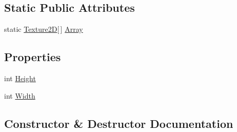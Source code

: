 \subsection*{Static Public Attributes}
\begin{DoxyCompactItemize}
\item 
static \hyperlink{classMicrosoft_1_1Xna_1_1Framework_1_1Graphics_1_1Texture2D}{Texture2\+D}\mbox{[}$\,$\mbox{]} \hyperlink{classMicrosoft_1_1Xna_1_1Framework_1_1Graphics_1_1Texture2D_a3d7775c2b083ed36b9a886b22af95ab2}{Array}
\end{DoxyCompactItemize}
\subsection*{Properties}
\begin{DoxyCompactItemize}
\item 
int \hyperlink{classMicrosoft_1_1Xna_1_1Framework_1_1Graphics_1_1Texture2D_aaadefba794062a2ca7e58ceb10b955a1}{Height}
\item 
int \hyperlink{classMicrosoft_1_1Xna_1_1Framework_1_1Graphics_1_1Texture2D_abbe7749c3b402f7dfe64f936774cfcd4}{Width}
\end{DoxyCompactItemize}


\subsection{Constructor \& Destructor Documentation}
\hypertarget{classMicrosoft_1_1Xna_1_1Framework_1_1Graphics_1_1Texture2D_a48893cead2a8a0961cb97894eb8a6d73}{}
